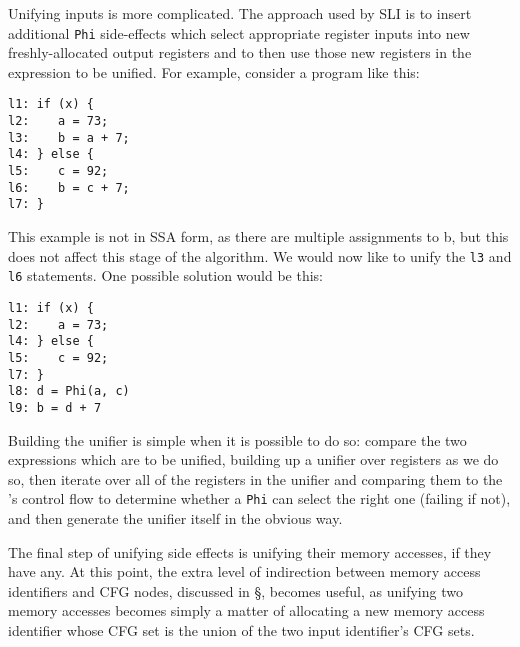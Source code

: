Unifying inputs is more complicated.  The approach used by SLI is to
insert additional \verb|Phi| side-effects which select appropriate
register inputs into new freshly-allocated output registers and to
then use those new registers in the expression to be unified.  For
example, consider a program like this:

\begin{verbatim}
l1: if (x) {
l2:    a = 73;
l3:    b = a + 7;
l4: } else {
l5:    c = 92;
l6:    b = c + 7;
l7: }
\end{verbatim}

This example is not in SSA form, as there are multiple assignments to
b, but this does not affect this stage of the algorithm.  We would now like to unify the \verb|l3| and
\verb|l6| statements.  One possible solution would be this:

\begin{verbatim}
l1: if (x) {
l2:    a = 73;
l4: } else {
l5:    c = 92;
l7: }
l8: d = Phi(a, c)
l9: b = d + 7
\end{verbatim}

Building the unifier is simple when it is possible to do so: compare
the two expressions which are to be unified, building up a unifier
over registers as we do so, then iterate over all of the registers in
the unifier and comparing them to the \StateMachine's control flow to
determine whether a \verb|Phi| can select the right one (failing if
not), and then generate the unifier itself in the obvious way.



The final step of unifying side effects is unifying their memory
accesses, if they have any.  At this point, the extra level of
indirection between memory access identifiers and CFG nodes, discussed
in \S{}, becomes useful, as unifying two memory accesses
becomes simply a matter of allocating a new memory access identifier
whose CFG set is the union of the two input identifier's CFG
sets.


